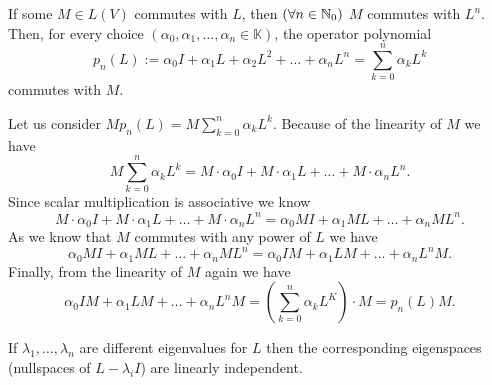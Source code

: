 \documentclass{article}
\begin{document}
\begin{problem}
  If some $M \in L(V)$ commutes with $L$, then $(\forall n \in \mathbb{N}_0)$ $M$ commutes with $L^n$.
  Then, for every choice $(\alpha_0, \alpha_1, \ldots, \alpha_n \in \mathbb{K})$, the operator polynomial
  \[p_n(L) := \alpha_0 I + \alpha_1 L + \alpha_2 L^2 + \ldots + \alpha_n L^n = \sum_{k = 0}^{n} \alpha_k L^k\]
  commutes with $M$.
\end{problem}

\begin{solution}
  Let us consider $M p_n(L) = M \sum_{k = 0}^{n} \alpha_k L^k$.
  Because of the linearity of $M$ we have
  \[M \sum_{k = 0}^{n} \alpha_k L^k = M \cdot \alpha_0 I + M \cdot \alpha_1 L + \ldots + M \cdot \alpha_n L^n.\]
  Since scalar multiplication is associative we know
  \[M \cdot \alpha_0 I + M \cdot \alpha_1 L + \ldots + M \cdot \alpha_n L^n = \alpha_0 M I + \alpha_1 M L + \ldots + \alpha_n M L^n.\]
  As we know that $M$ commutes with any power of $L$ we have
  \[\alpha_0 M I + \alpha_1 M L + \ldots + \alpha_n M L^n = \alpha_0 I M + \alpha_1 L M + \ldots + \alpha_n L^n M.\]
  Finally, from the linearity of $M$ again we have
  \[\alpha_0 I M + \alpha_1 L M + \ldots + \alpha_n L^n M = (\sum_{k = 0}^{n} \alpha_k L^K) \cdot M = p_n(L) M.\]
\end{solution}

\begin{problem}
  If $\lambda_1, \ldots, \lambda_n$ are different eigenvalues for $L$ then the corresponding eigenspaces (nullspaces of $L - \lambda_i I$) are linearly independent.
\end{problem}
\end{document}
